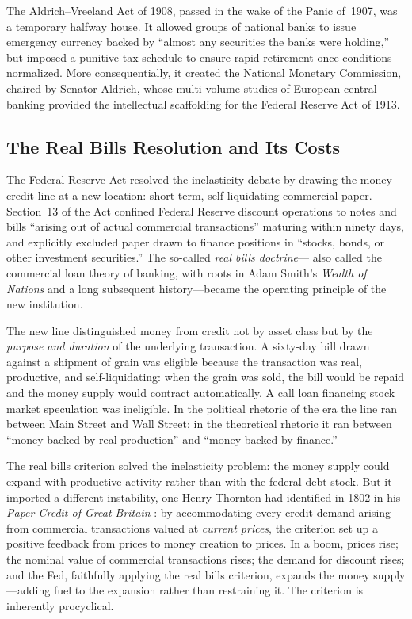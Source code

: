 \documentclass[12pt]{article}
\begin{document}
The Aldrich--Vreeland Act of 1908, passed in the wake of the Panic
of~1907, was a temporary halfway house.  It allowed groups of national
banks to issue emergency currency backed by ``almost any securities the
banks were holding,'' but imposed a punitive tax schedule to ensure
rapid retirement once conditions normalized.  More consequentially, it
created the National Monetary Commission, chaired by Senator Aldrich,
whose multi-volume studies of European central banking provided the
intellectual scaffolding for the Federal Reserve Act of 1913.

\subsection{The Real Bills Resolution and Its Costs}

The Federal Reserve Act resolved the inelasticity debate by drawing
the money--credit line at a new location: short-term, self-liquidating
commercial paper.  Section~13 of the Act confined Federal Reserve
discount operations to notes and bills ``arising out of actual
commercial transactions'' maturing within ninety days, and explicitly
excluded paper drawn to finance positions in ``stocks, bonds, or other
investment securities.''  The so-called \emph{real bills doctrine}---
also called the commercial loan theory of banking, with roots in Adam
Smith's \textit{Wealth of Nations} and a long subsequent
history---became the operating principle of the new institution.

The new line distinguished money from credit not by asset class but
by the \emph{purpose and duration} of the underlying transaction.  A
sixty-day bill drawn against a shipment of grain was eligible because
the transaction was real, productive, and self-liquidating: when the
grain was sold, the bill would be repaid and the money supply would
contract automatically.  A call loan financing stock market speculation
was ineligible.  In the political rhetoric of the era the line ran
between Main Street and Wall Street; in the theoretical rhetoric it
ran between ``money backed by real production'' and ``money backed
by finance.''

The real bills criterion solved the inelasticity problem: the money
supply could expand with productive activity rather than with the
federal debt stock.  But it imported a different instability, one
Henry Thornton had identified in 1802 in his
\textit{Paper Credit of Great Britain} \citep{Thornton1802}: by
accommodating every credit demand arising from commercial transactions
valued at \emph{current prices}, the criterion set up a positive
feedback from prices to money creation to prices.  In a boom, prices
rise; the nominal value of commercial transactions rises; the demand for
discount rises; and the Fed, faithfully applying the real bills
criterion, expands the money supply---adding fuel to the expansion
rather than restraining it.  The criterion is inherently procyclical.
\end{document}
